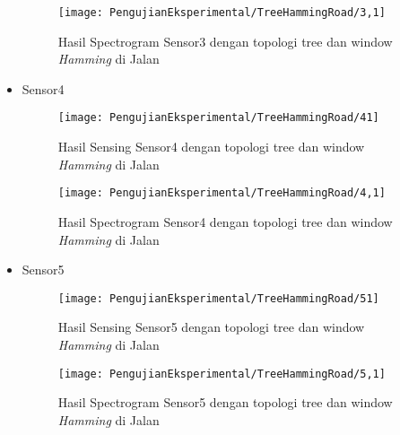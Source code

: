 \begin{itemize}
\begin{figure}[H]
	\centering
	\texttt{[image: PengujianEksperimental/TreeHammingRoad/3,1]}
	\caption[Hasil Spectrogram Sensor3 dengan topologi tree dan window {\it Hamming} di Jalan]{Hasil Spectrogram Sensor3 dengan topologi tree dan window {\it Hamming} di Jalan} 
	\label{fig:hasilJalanTreeHamm3,1}
\end{figure}

\item Sensor4
\begin{figure}[H]
	\centering
	\texttt{[image: PengujianEksperimental/TreeHammingRoad/41]}
	\caption[Hasil Sensing Sensor4 dengan topologi tree dan window {\it Hamming} di Jalan]{Hasil Sensing Sensor4 dengan topologi tree dan window {\it Hamming} di Jalan} 
	\label{fig:hasilJalanTreeHamm41}
\end{figure}

\begin{figure}[H]
	\centering
	\texttt{[image: PengujianEksperimental/TreeHammingRoad/4,1]}
	\caption[Hasil Spectrogram Sensor4 dengan topologi tree dan window {\it Hamming} di Jalan]{Hasil Spectrogram Sensor4 dengan topologi tree dan window {\it Hamming} di Jalan} 
	\label{fig:hasilJalanTreeHamm4,1}
\end{figure}

\item Sensor5
\begin{figure}[H]
	\centering
	\texttt{[image: PengujianEksperimental/TreeHammingRoad/51]}
	\caption[Hasil Sensing Sensor5 dengan topologi tree dan window {\it Hamming} di Jalan]{Hasil Sensing Sensor5 dengan topologi tree dan window {\it Hamming} di Jalan} 
	\label{fig:hasilJalanTreeHamm51}
\end{figure}

\begin{figure}[H]
	\centering
	\texttt{[image: PengujianEksperimental/TreeHammingRoad/5,1]}
	\caption[Hasil Spectrogram Sensor5 dengan topologi tree dan window {\it Hamming} di Jalan]{Hasil Spectrogram Sensor5 dengan topologi tree dan window {\it Hamming} di Jalan} 
	\label{fig:hasilJalanTreeHamm5,1}
\end{figure}
\end{itemize}